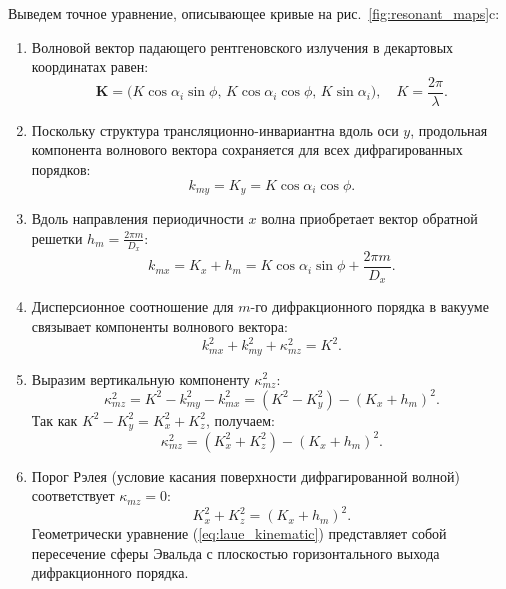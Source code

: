 \documentclass[a4paper,11pt]{article}
\begin{document}
Выведем точное уравнение, описывающее кривые на рис.~\ref{fig:resonant_maps}c:
\begin{enumerate}
    \item Волновой вектор падающего рентгеновского излучения в декартовых координатах равен:
    \begin{equation}
        \mathbf{K} = \big(K \cos\alpha_i \sin\phi, \, K \cos\alpha_i \cos\phi, \, K \sin\alpha_i\big), \quad K = \frac{2\pi}{\lambda}.
    \end{equation}
    \item Поскольку структура трансляционно-инвариантна вдоль оси $y$, продольная компонента волнового вектора сохраняется для всех дифрагированных порядков:
    \begin{equation}
        k_{my} = K_y = K \cos\alpha_i \cos\phi.
    \end{equation}
    \item Вдоль направления периодичности $x$ волна приобретает вектор обратной решетки $h_m = \frac{2\pi m}{D_x}$:
    \begin{equation}
        k_{mx} = K_x + h_m = K \cos\alpha_i \sin\phi + \frac{2\pi m}{D_x}.
    \end{equation}
    \item Дисперсионное соотношение для $m$-го дифракционного порядка в вакууме связывает компоненты волнового вектора:
    \begin{equation}
        k_{mx}^2 + k_{my}^2 + \kappa_{mz}^2 = K^2.
    \end{equation}
    \item Выразим вертикальную компоненту $\kappa_{mz}^2$:
    \begin{equation}
        \kappa_{mz}^2 = K^2 - k_{my}^2 - k_{mx}^2 = (K^2 - K_y^2) - (K_x + h_m)^2.
    \end{equation}
    Так как $K^2 - K_y^2 = K_x^2 + K_z^2$, получаем:
    \begin{equation}
        \kappa_{mz}^2 = (K_x^2 + K_z^2) - (K_x + h_m)^2.
    \end{equation}
    \item Порог Рэлея (условие касания поверхности дифрагированной волной) соответствует $\kappa_{mz} = 0$:
    \begin{equation}
        K_x^2 + K_z^2 = (K_x + h_m)^2.
        \label{eq:laue_kinematic}
    \end{equation}
    Геометрически уравнение (\ref{eq:laue_kinematic}) представляет собой пересечение сферы Эвальда с плоскостью горизонтального выхода дифракционного порядка.

\end{enumerate}
\end{document}
